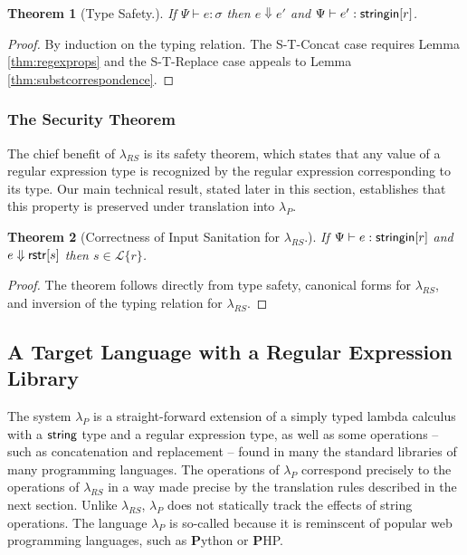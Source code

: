 \documentclass[9pt]{sig-alternate}
\newtheorem{thm}{Theorem}
\theoremstyle{definition}
\newcommand{\Lagr}{\mathcal{L}}
\newcommand{\lang}[1]{\Lagr\{#1\}}
\newcommand{\lambdas}{\lambda_{RS}}
\newcommand{\lambdap}{\lambda_P}
\newcommand{\stringin}[1]{{\sf stringin}[#1]}
\newcommand{\str}{{\sf string}}
\newcommand{\sctx}{\Psi} %
\newcommand{\sreduces}{ \Downarrow }
\begin{document}
\begin{thm}[Type Safety.] \label{thm:scorrect}
  If $\sctx \vdash e : \sigma$ 
  then $e \sreduces e'$ and $\sctx \vdash e' : \stringin{r}$.
\end{thm}
\begin{proof}
By induction on the typing relation.
The S-T-Concat case requires Lemma \ref{thm:regexprops} 
and the S-T-Replace case appeals to Lemma \ref{thm:substcorrespondence}.
\end{proof}

\subsubsection{The Security Theorem}\label{sec:securitythm}

The chief benefit of $\lambdas$ is its safety theorem, which states that any value of
a regular expression type is recognized by the regular expression corresponding to its type.
Our main technical result, stated later in this section, establishes that this property
is preserved under translation into $\lambdap$.

\begin{thm}[Correctness of Input Sanitation for $\lambdas$.]\label{thm:scorrect}
  If  $\sctx \vdash e : \stringin{r}$ and $e \sreduces \rstr{s}$ then $s \in \lang{r}$.
\end{thm}
\begin{proof}
  The theorem follows directly from type safety, canonical forms for $\lambdas$, and inversion of the typing relation for $\lambdas$.
\end{proof}

\subsection{A Target Language with a Regular Expression Library}\label{sec:p}

The system $\lambdap$ is a straight-forward extension of a simply typed lambda calculus
with a $\str$ type and a regular expression type, as well as 
some operations -- such as concatenation and replacement -- found in many the standard libraries of many programming languages.
The operations of $\lambdap $ correspond precisely to the operations of $\lambdas$ in a way made precise by the translation rules described in the next section.
Unlike $\lambdas$, $\lambdap$ does not statically track the effects of string operations.
The language $\lambdap$ is so-called because it is reminscent of popular web programming languages,
such as \textbf{P}ython or \textbf{P}HP.
\end{document}
